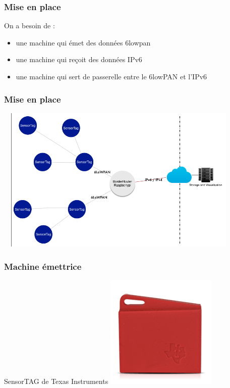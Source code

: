 \documentclass{smilebeamer}
\begin{document}

\begin{frame}
\frametitle{Mise en place}

On a besoin de : 

\begin{itemize}
\item une machine qui émet des données 6lowpan
\item une machine qui reçoit des données IPv6
\item une machine qui sert de passerelle entre le 6lowPAN et l'IPv6
\end{itemize}
\end{frame}

\begin{frame}
\frametitle{Mise en place}
\includegraphics[width=12cm,height=7cm]{img/6lowpan.png}
\end{frame}


\begin{frame}
\frametitle{Machine émettrice}
\begin{center}
SensorTAG de Texas Instruments
\includegraphics{img/sensortag.png}


\end{center}
\end{frame}
\end{document}
